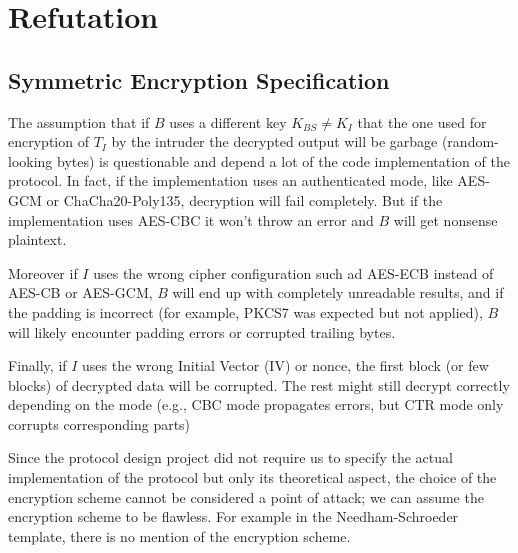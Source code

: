 \documentclass[11pt]{article}
\begin{document}
    \section{Refutation}
        \subsection{Symmetric Encryption Specification}



            The assumption that if $B$ uses a different key $K_{BS} \neq K_I$ that the one used for encryption of $T_I$ by the
            intruder the decrypted output will be garbage (random-looking bytes) is questionable and depend a lot of
            the code implementation of the protocol. In fact, if the implementation uses an authenticated mode,
            like AES-GCM or ChaCha20-Poly135, decryption will fail completely. But if the implementation uses AES-CBC
            it won't throw an error and $B$ will get nonsense plaintext.

            \vspace{0.5cm}

            Moreover if $I$ uses the wrong cipher configuration such ad AES-ECB instead of AES-CB or AES-GCM, $B$ will
            end up with completely unreadable results, and if the padding is incorrect (for example, PKCS7 was expected
            but not applied), $B$ will likely encounter padding errors or corrupted trailing bytes.

            \vspace{0.5cm}

            Finally, if $I$ uses the wrong Initial Vector (IV) or nonce, the first block (or few blocks) of
            decrypted data will be corrupted. The rest might still decrypt correctly depending on the mode (e.g., CBC
            mode propagates errors, but CTR mode only corrupts corresponding parts)



            \vspace{0.5cm}

            Since the protocol design project did not require us to specify the actual implementation of the protocol
            but only its theoretical aspect, the choice of the encryption scheme cannot be considered a point of attack;
            we can assume the encryption scheme to be flawless. For example in the Needham-Schroeder template, there is
            no mention of the encryption scheme.
\end{document}
